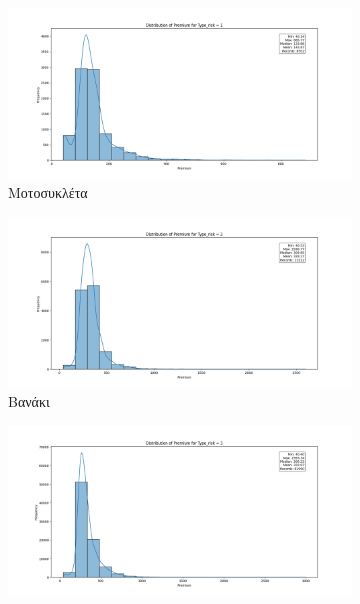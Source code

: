 \documentclass{llncs}
\begin{document}
\begin{figure}[h!]
    \centering
     \begin{subfigure}{0.45\linewidth}
      \includegraphics[width=\linewidth]{images/premium_risk1.png}
      \caption{Μοτοσυκλέτα}
      \label{fig:subfig1}
     \end{subfigure}
     \begin{subfigure}{0.45\linewidth}
      \includegraphics[width=\linewidth]{images/premium_risk2.png}
      \caption{Βανάκι}
      \label{fig:subfig2}
      \end{subfigure}
  \vfill
       \begin{subfigure}{0.45\linewidth}
       \includegraphics[width=\linewidth]{images/premium_risk3.png}

\end{subfigure}
\end{figure}
\end{document}

